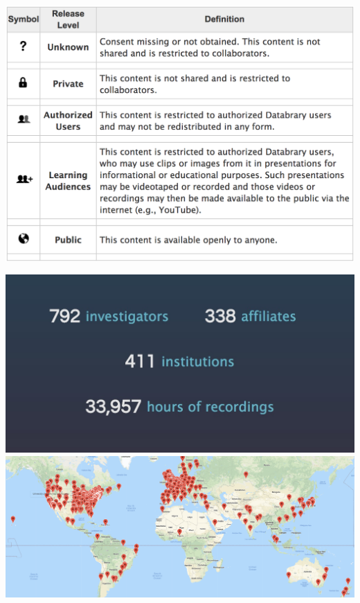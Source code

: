 \documentclass[landscape,final,paperwidth=75in,paperheight=48in,fontscale=0.285]{baposter}
\begin{document}
\begin{poster}
{\begin{center}
  \includegraphics[scale=0.52,valign=t]{img/DatabraryReleaseLevels.png}
\end{center}
}
{
\begin{center}
    \includegraphics[scale=0.30]{img/databrary-stats.jpg}
    \hfill
    \includegraphics[scale=0.22]{img/databrary-map.png}

\end{center}}
\end{poster}
\end{document}
